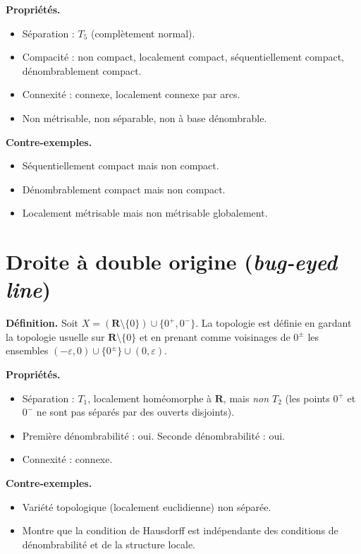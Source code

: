 \documentclass[12pt,a4paper,openany]{book}
\theoremstyle{definition}
\theoremstyle{cours}
\theoremstyle{coursnormal}
\begin{document}
\textbf{Propriétés.}
\begin{itemize}
  \item Séparation : $T_5$ (complètement normal).
  \item Compacité : non compact, localement compact, séquentiellement
    compact, dénombrablement compact.
  \item Connexité : connexe, localement connexe par arcs.
  \item Non métrisable, non séparable, non à base dénombrable.
\end{itemize}

\textbf{Contre-exemples.}
\begin{itemize}
  \item Séquentiellement compact mais non compact.
  \item Dénombrablement compact mais non compact.
  \item Localement métrisable mais non métrisable globalement.
\end{itemize}

\section{Droite à double origine (\textit{bug-eyed line})}
\label{app:double-origine}

\textbf{Définition.} Soit $X=(\mathbf{R}\setminus\{0\})\cup\{0^+,0^-\}$.
La topologie est définie en gardant la topologie usuelle sur
$\mathbf{R}\setminus\{0\}$ et en prenant comme voisinages de $0^\pm$
les ensembles $(-\varepsilon,0)\cup\{0^\pm\}\cup(0,\varepsilon)$.

\textbf{Propriétés.}
\begin{itemize}
  \item Séparation : $T_1$, localement homéomorphe à $\mathbf{R}$,
    mais \emph{non $T_2$} (les points $0^+$ et $0^-$ ne sont pas
    séparés par des ouverts disjoints).
  \item Première dénombrabilité : oui. Seconde dénombrabilité : oui.
  \item Connexité : connexe.
\end{itemize}

\textbf{Contre-exemples.}
\begin{itemize}
  \item Variété topologique (localement euclidienne) non séparée.
  \item Montre que la condition de Hausdorff est indépendante des
    conditions de dénombrabilité et de la structure locale.
\end{itemize}
\end{document}
